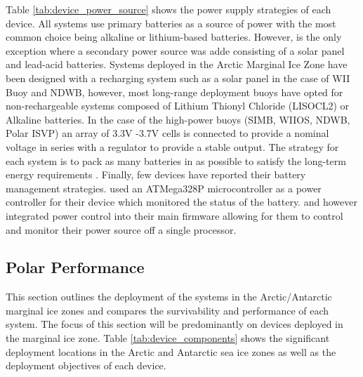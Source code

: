 Table \ref{tab:device_power_source} shows the power supply strategies of each device. All systems use primary batteries as a source of power with the most common choice being alkaline or lithium-based batteries. However, \textcite{doble2017robust} is the only exception where a secondary power source was adde consisting of a solar panel and lead-acid batteries. Systems deployed in the Arctic Marginal Ice Zone have been designed with a recharging system such as a solar panel in the case of WII Buoy and NDWB, however, most long-range deployment buoys have opted for non-rechargeable systems composed of Lithium Thionyl Chloride (LISOCL2) or Alkaline batteries. In the case of the high-power buoys (SIMB, WIIOS, NDWB, Polar ISVP) an array of 3.3V -3.7V cells is connected to provide a nominal voltage in series with a regulator to provide a stable output. The strategy for each system is to pack as many batteries in as possible to satisfy the long-term energy requirements \cite{doble2017robust,rabault2019open}. Finally, few devices have reported their battery management strategies. \textcite{rabault2019open} used an ATMega328P microcontroller as a power controller for their device which monitored the status of the battery. \textcite{trident} and \textcite{kohout2015device} however integrated power control into their main firmware allowing for them to control and monitor their power source off a single processor.

\subsection{Polar Performance}

This section outlines the deployment of the systems in the Arctic/Antarctic marginal ice zones and compares the survivability and performance of each system. The focus of this section will be predominantly on devices deployed in the marginal ice zone. Table \ref{tab:device_components} shows the significant deployment locations in the Arctic and Antarctic sea ice zones as well as the deployment objectives of each device. 

